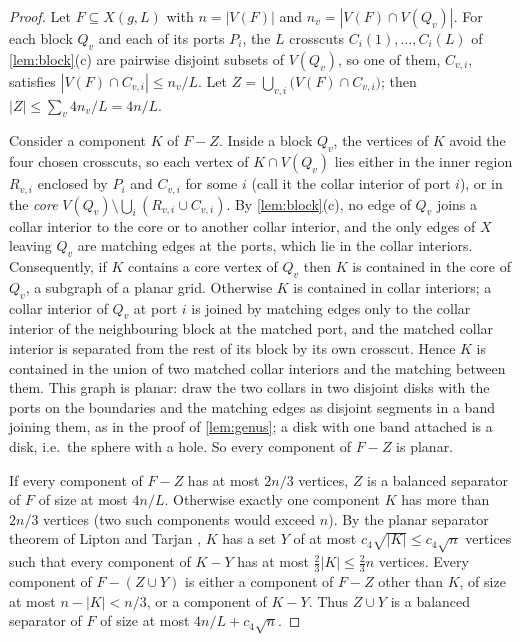 \documentclass[11pt,a4paper]{article}
\theoremstyle{plain}
\theoremstyle{definition}
\theoremstyle{remark}
\begin{document}
\label{pf:hered}
\lemhered*
\begin{proof}
Let $F\subseteq X(g,L)$ with $n=|V(F)|$ and $n_v=|V(F)\cap V(Q_v)|$. For each block $Q_v$ and each of its ports $P_i$, the $L$ crosscuts $C_i(1),\dots,C_i(L)$ of \cref{lem:block}(c) are pairwise disjoint subsets of $V(Q_v)$, so one of them, $C_{v,i}$, satisfies $|V(F)\cap C_{v,i}|\le n_v/L$. Let $Z=\bigcup_{v,i}\bigl(V(F)\cap C_{v,i}\bigr)$; then $|Z|\le\sum_v4n_v/L=4n/L$.

Consider a component $K$ of $F-Z$. Inside a block $Q_v$, the vertices of $K$ avoid the four chosen crosscuts, so each vertex of $K\cap V(Q_v)$ lies either in the inner region $R_{v,i}$ enclosed by $P_i$ and $C_{v,i}$ for some $i$ (call it the collar interior of port $i$), or in the \emph{core} $V(Q_v)\setminus\bigcup_i(R_{v,i}\cup C_{v,i})$. By \cref{lem:block}(c), no edge of $Q_v$ joins a collar interior to the core or to another collar interior, and the only edges of $X$ leaving $Q_v$ are matching edges at the ports, which lie in the collar interiors. Consequently, if $K$ contains a core vertex of $Q_v$ then $K$ is contained in the core of $Q_v$, a subgraph of a planar grid. Otherwise $K$ is contained in collar interiors; a collar interior of $Q_v$ at port $i$ is joined by matching edges only to the collar interior of the neighbouring block at the matched port, and the matched collar interior is separated from the rest of its block by its own crosscut. Hence $K$ is contained in the union of two matched collar interiors and the matching between them. This graph is planar: draw the two collars in two disjoint disks with the ports on the boundaries and the matching edges as disjoint segments in a band joining them, as in the proof of \cref{lem:genus}; a disk with one band attached is a disk, i.e.\ the sphere with a hole. So every component of $F-Z$ is planar.

If every component of $F-Z$ has at most $2n/3$ vertices, $Z$ is a balanced separator of $F$ of size at most $4n/L$. Otherwise exactly one component $K$ has more than $2n/3$ vertices (two such components would exceed $n$). By the planar separator theorem of Lipton and Tarjan \cite{LT79}, $K$ has a set $Y$ of at most $c_4\sqrt{|K|}\le c_4\sqrt n$ vertices such that every component of $K-Y$ has at most $\frac23|K|\le\frac23n$ vertices. Every component of $F-(Z\cup Y)$ is either a component of $F-Z$ other than $K$, of size at most $n-|K|<n/3$, or a component of $K-Y$. Thus $Z\cup Y$ is a balanced separator of $F$ of size at most $4n/L+c_4\sqrt n$.
\end{proof}
\end{document}

